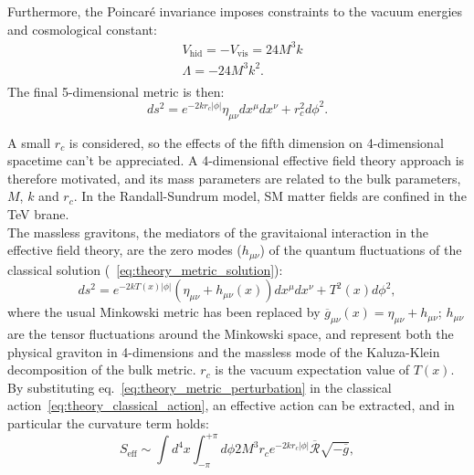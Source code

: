 Furthermore, the Poincar\'e invariance imposes constraints to the vacuum energies and cosmological constant:
\begin{equation}
\begin{split}
 & V_{\text{hid}} = - V_{\text{vis}} = 24 M^3 k \\
 & \Lambda = -24 M^3 k^2.\\
\end{split}
\label{eq:theory_vacuum_energies}
\end{equation}
The final 5-dimensional metric is then:
\begin{equation}
ds^2 = e^{-2 k r_c \left| \phi \right|} \eta_{\mu \nu} dx^{\mu} dx^{\nu} + r_c^2 d{\phi}^2.
\label{eq:theory_metric_solution}
\end{equation}

A small $r_c$ is considered, so the effects of the fifth dimension on 4-dimensional spacetime can't be appreciated. A 4-dimensional effective field theory approach is therefore motivated, and its mass parameters are related to the bulk parameters, $M$, $k$ and $r_c$. In the Randall-Sundrum model, SM matter fields are confined in the TeV brane.\\
The massless gravitons, the mediators of the gravitaional interaction in the effective field theory, are the zero modes ($h_{\mu \nu}$) of the quantum fluctuations of the classical solution (~\ref{eq:theory_metric_solution}):
\begin{equation}
ds^2 = e^{-2 k T(x) \left| \phi \right|} \left( \eta_{\mu \nu} + h_{\mu \nu}(x) \right) dx^{\mu} dx^{\nu} + T^2(x) d{\phi}^2,
\label{eq:theory_metric_perturbation}
\end{equation}
where the usual Minkowski metric has been replaced by $\overline{g}_{\mu \nu} (x) = \eta_{\mu \nu} + h_{\mu \nu}$; $h_{\mu \nu}$ are the tensor fluctuations around the Minkowski space, and represent both the physical graviton in 4-dimensions and the massless mode of the Kaluza-Klein decomposition of the bulk metric. $r_c$ is the vacuum expectation value of $T(x)$.\\
By substituting eq.~\ref{eq:theory_metric_perturbation} in the classical action~\ref{eq:theory_classical_action}, an effective action can be extracted, and in particular the curvature term holds:
\begin{equation}
S_{\text{eff}} \sim \int d^4 x \int_{-\pi}^{+\pi} d \phi 2 M^3 r_c e^{-2 k r_c \left| \phi \right|} \overline{\mathcal{R}} \sqrt{-\overline{g}},
\label{eq:theory_effective_action}
\end{equation}
